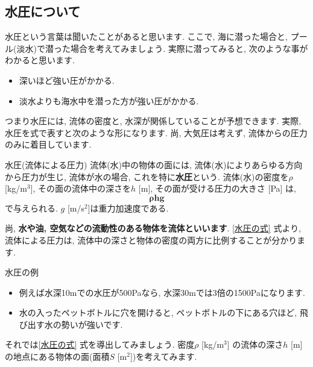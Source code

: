\documentclass[11pt,dvipdfmx]{jsarticle}
\numberwithin{equation}{section} %
\begin{document}
\subsection{水圧について}
水圧という言葉は聞いたことがあると思います. ここで, 海に潜った場合と, プール(淡水)で潜った場合を考えてみましょう. 実際に潜ってみると, 次のような事がわかると思います. 
\begin{itemize}
    \item 深いほど強い圧がかかる. 
    \item 淡水よりも海水中を潜った方が強い圧がかかる.
\end{itemize}
つまり水圧には, 流体の密度と, 水深が関係していることが予想できます. 実際, 水圧を式で表すと次のような形になります. 尚, 大気圧は考えず, 流体からの圧力のみに着目しています.
\begin{freebox}{水圧(流体による圧力)}
    流体(水)中の物体の面には, 流体(水)によりあらゆる方向から圧力が生じ, 流体が水の場合, これを特に\textbf{水圧}という. 流体(水)の密度を$\rho$ [kg/m$^3$], その面の流体中の深さを$h$ [m], その面が受ける圧力の大きさ [Pa] は, 
    \begin{equation}
        \bm{\rho  hg} \label{水圧の式}
    \end{equation}
    で与えられる. $g$ [m/s$^2$]は重力加速度である. 
\end{freebox}
尚, \textbf{水や油, 空気などの流動性のある物体を流体といいます}. \eqref{水圧の式} 式より, 流体による圧力は, 流体中の深さと物体の密度の両方に比例することが分かります. 
\begin{exbox}{水圧の例}
    \begin{itemize}
        \item 例えば水深10mでの水圧が500Paなら, 水深30mでは3倍の1500Paになります. 
        \item 水の入ったペットボトルに穴を開けると, ペットボトルの下にある穴ほど, 飛び出す水の勢いが強いです.
    \end{itemize}
\end{exbox}
それでは\eqref{水圧の式} 式を導出してみましょう. 密度$\rho$ [kg/m$^3$] の流体の深さ$h$ [m]の地点にある物体の面(面積$S$ [m$^2$])を考えてみます. 
\end{document}
